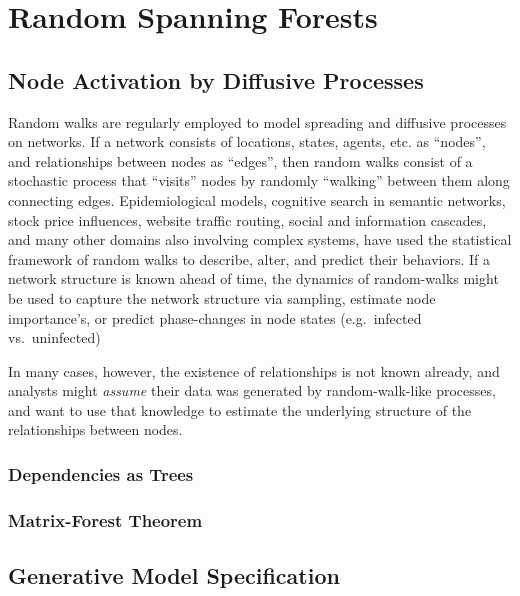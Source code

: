 \documentclass[%
	12pt,
		oneside,
		letterpaper
]{book}
\begin{document}
\chapter{Random Spanning Forests}\label{random-spanning-forests}

\section{Node Activation by Diffusive
Processes}\label{node-activation-by-diffusive-processes}

Random walks are regularly employed to model spreading and diffusive
processes on networks. If a network consists of locations, states,
agents, etc. as ``nodes'', and relationships between nodes as ``edges'',
then random walks consist of a stochastic process that ``visits'' nodes
by randomly ``walking'' between them along connecting edges.
Epidemiological models, cognitive search in semantic networks, stock
price influences, website traffic routing, social and information
cascades, and many other domains also involving complex systems, have
used the statistical framework of random walks to describe, alter, and
predict their behaviors. If a network structure is known ahead of time,
the dynamics of random-walks might be used to capture the network
structure via sampling, estimate node importance's, or predict
phase-changes in node states (e.g.~infected vs.~uninfected)

In many cases, however, the existence of relationships is not known
already, and analysts might \emph{assume} their data was generated by
random-walk-like processes, and want to use that knowledge to estimate
the underlying structure of the relationships between nodes.

\subsection{Dependencies as Trees}\label{dependencies-as-trees}

\subsection{Matrix-Forest Theorem}\label{matrix-forest-theorem}

\section{Generative Model
Specification}\label{generative-model-specification}
\end{document}

